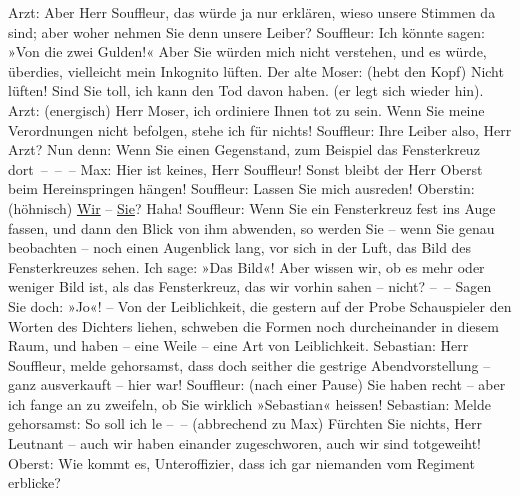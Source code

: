 \begin{ledgroupsized}[t]{13cm}
           \pstart
           Arzt: Aber Herr Souffleur, das würde ja nur erklären, wieso unsere Stimmen da sind;
               aber woher nehmen Sie denn unsere Leiber?\pend
           \pstart
           Souffleur: Ich könnte sagen: »Von die zwei Gulden!« Aber Sie würden mich nicht
               verstehen, und es würde, überdies, vielleicht mein Inkognito lüften.\pend
           \pstart
           Der alte Moser: (hebt den Kopf) Nicht lüften! Sind Sie toll, ich kann den Tod davon
               haben. (er legt sich wieder hin).\pend
           \pstart
           Arzt: (energisch) Herr Moser, ich ordiniere Ihnen tot zu sein. Wenn Sie meine
               Verordnungen nicht befolgen, stehe ich für nichts!\pend
           \pstart
           Souffleur: Ihre Leiber also, Herr Arzt? Nun denn: Wenn Sie einen Gegenstand, zum
               Beispiel das Fensterkreuz dort – – –\pend
           \pstart
           Max: Hier ist keines, Herr Souffleur! Sonst bleibt der Herr Oberst beim
               Hereinspringen hängen!\pend
           \pstart
           {\pb}Souffleur: Lassen Sie mich
               ausreden!\pend
           \pstart
           Oberstin: (höhnisch) \uline{Wir} – \uline{Sie}? Haha!\pend
           \pstart
           Souffleur: Wenn Sie ein Fensterkreuz fest ins Auge fassen, und dann den Blick von ihm
               abwenden, so werden Sie – wenn Sie genau beobachten – noch einen Augenblick lang, vor
               sich in der Luft, das Bild des Fensterkreuzes sehen. Ich sage: »Das Bild«! Aber
               wissen wir, ob es mehr oder weniger Bild ist, als das Fensterkreuz, das wir vorhin
               sahen – nicht? – – Sagen Sie doch: »Jo«! – Von der Leiblichkeit, die gestern auf der
               Probe Schauspieler den Worten des Dichters liehen, schweben die Formen noch
               durcheinander in diesem Raum, und haben – eine Weile – eine Art von Leiblichkeit.\pend
           \pstart
           Sebastian: Herr Souffleur, melde gehorsamst, dass doch seither die gestrige
               Abendvorstellung – ganz ausverkauft – hier war!\pend
           \pstart
           Souffleur: (nach einer Pause) Sie haben recht – aber ich fange an zu zweifeln, ob Sie
               wirklich »Sebastian« heissen!\pend
           \pstart
           Sebastian: Melde gehorsamst: So soll ich le – – (abbrechend zu Max) Fürchten Sie
               nichts, Herr Leutnant – auch wir haben einander zugeschworen, auch wir sind
               totgeweiht!\pend
           \pstart
           Oberst: Wie kommt es, Unteroffizier, dass ich gar niemanden vom Regiment
               erblicke?\pend

\end{ledgroupsized}
